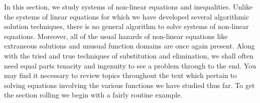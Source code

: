 

\setcounter{footnote}{0}

\label{NonLinear}

In this section, we study systems of non-linear equations and inequalities.   Unlike the systems of linear equations for which we have developed several algorithmic solution techniques, there is no general algorithm to solve systems of non-linear equations.  Moreover, all of the usual hazards of non-linear equations like extraneous solutions and unusual function domains are once again present.  Along with the tried and true techniques of substitution and elimination, we shall often need equal parts tenacity and ingenuity to see a problem through to the end.  You may find it necessary to review topics throughout the text which pertain to solving equations involving the various functions we have studied thus far.  To get the section rolling we begin with a fairly routine example.

